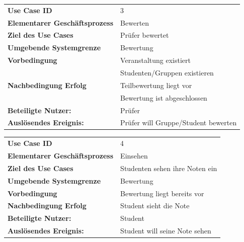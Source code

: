 	
			\begin{table}[H]
			\begin{tabular}{ll}
			 \textbf{Use Case ID} & 3 \\
		 	 \textbf{Elementarer Geschäftsprozess} &  Bewerten \\ 
			 \textbf{Ziel des Use Cases} & Prüfer bewertet  \\
			 \textbf{Umgebende Systemgrenze} & Bewertung \\ 
			 \textbf{Vorbedingung} & Veranstaltung existiert \\
			  					   & Studenten/Gruppen existieren \\ 
			 \textbf{Nachbedingung Erfolg} & Teilbewertung liegt vor \\
			 							   & Bewertung ist abgeschlossen\\
			 							    
			 \textbf{Beteiligte Nutzer:} & Prüfer \\ 
		     \textbf{Auslösendes Ereignis:} & Prüfer will Gruppe/Student bewerten \\ 
			 
			\end{tabular} 
			\label{tab:usecase_3}
			\end{table}
			
			\begin{table}[H]
			\begin{tabular}{ll}
			 \textbf{Use Case ID} & 4 \\
		 	 \textbf{Elementarer Geschäftsprozess} &  Einsehen \\ 
			 \textbf{Ziel des Use Cases} & Studenten sehen ihre Noten ein  \\
			 \textbf{Umgebende Systemgrenze} & Bewertung \\ 
			 \textbf{Vorbedingung} & Bewertung liegt bereits vor \\
			 \textbf{Nachbedingung Erfolg} & Student sieht die Note\\
			 			    
			 \textbf{Beteiligte Nutzer:} & Student \\ 
		     \textbf{Auslösendes Ereignis:} & Student will seine Note sehen\\ 
			 
			\end{tabular} 
			\label{tab:usecase_4}
			\end{table}
			
